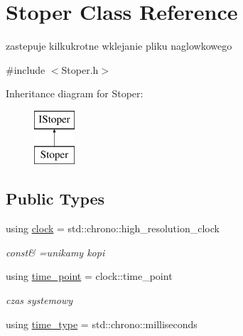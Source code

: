 \hypertarget{class_stoper}{\section{Stoper Class Reference}
\label{class_stoper}
}


zastepuje kilkukrotne wklejanie pliku naglowkowego  




{\ttfamily \#include $<$Stoper.\-h$>$}

Inheritance diagram for Stoper\-:\begin{figure}[H]
\begin{center}
\leavevmode
\includegraphics[height=2.000000cm]{class_stoper}
\end{center}
\end{figure}
\subsection*{Public Types}
\begin{DoxyCompactItemize}
\item 
using \hyperlink{class_stoper_ac7b1a0995c65c28a71e3ceabf5c6f965}{clock} = std\-::chrono\-::high\-\_\-resolution\-\_\-clock
\begin{DoxyCompactList}\small\item\em const\& =unikamy kopi \end{DoxyCompactList}\item 
using \hyperlink{class_stoper_a7d5d891cde8e9882bea254614a0fd2dd}{time\-\_\-point} = clock\-::time\-\_\-point
\begin{DoxyCompactList}\small\item\em czas systemowy \end{DoxyCompactList}\item 
using \hyperlink{class_stoper_a249c00c1592a239a8463880dcd657dd3}{time\-\_\-type} = std\-::chrono\-::milliseconds
\end{DoxyCompactItemize}
